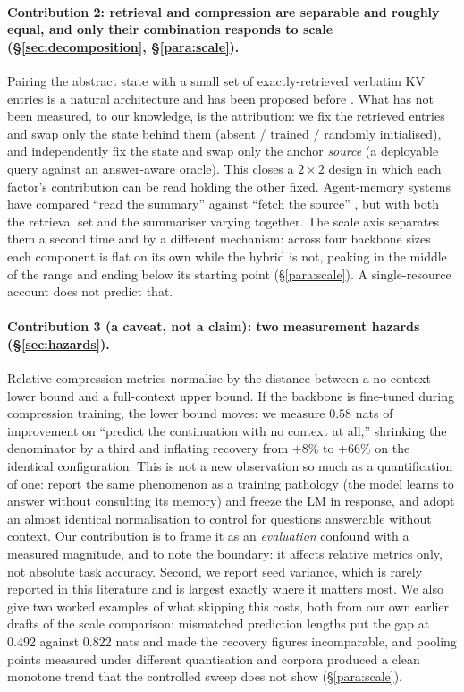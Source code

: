 \documentclass[11pt]{article}
\begin{document}
\paragraph{Contribution 2: retrieval and compression are separable and roughly
equal, and only their combination responds to scale
(\S\ref{sec:decomposition}, \S\ref{para:scale}).}
Pairing the abstract state with a small set of exactly-retrieved verbatim KV
entries is a natural architecture and has been proposed before
\citep{strongdrafts,specache}. What has not been measured, to our knowledge, is
the attribution: we fix the retrieved entries and swap only the state behind
them (absent / trained / randomly initialised), and independently fix the state
and swap only the anchor \emph{source} (a deployable query against an
answer-aware oracle). This closes a $2\times2$ design in which each factor's
contribution can be read holding the other fixed. Agent-memory systems have
compared ``read the summary'' against ``fetch the source''
\citep{justmem,infinimemory}, but with both the retrieval set and the summariser
varying together. The scale axis separates them a second time and by a different
mechanism: across four backbone sizes each component is flat on its own while the
hybrid is not, peaking in the middle of the range and ending below its starting
point (\S\ref{para:scale}). A single-resource account does not predict that.

\paragraph{Contribution 3 (a caveat, not a claim): two measurement hazards
(\S\ref{sec:hazards}).}
Relative compression metrics normalise by the distance between a no-context
lower bound and a full-context upper bound. If the backbone is fine-tuned during
compression training, the lower bound moves: we measure $0.58$ nats of
improvement on ``predict the continuation with no context at all,'' shrinking the
denominator by a third and inflating recovery from $+8\%$ to $+66\%$ on the
identical configuration. This is not a new observation so much as a
quantification of one: \citet{ccm} report the same phenomenon as a training
pathology (the model learns to answer without consulting its memory) and freeze
the LM in response, and \citet{simplecc} adopt an almost identical normalisation
to control for questions answerable without context. Our contribution is to
frame it as an \emph{evaluation} confound with a measured magnitude, and to note
the boundary: it affects relative metrics only, not absolute task accuracy.
Second, we report seed variance, which is rarely reported in this literature and
is largest exactly where it matters most. We also give two worked examples of
what skipping this costs, both from our own earlier drafts of the scale
comparison: mismatched prediction lengths put the gap at 0.492 against 0.822
nats and made the recovery figures incomparable, and pooling points measured
under different quantisation and corpora produced a clean monotone trend that
the controlled sweep does not show (\S\ref{para:scale}).
\end{document}
